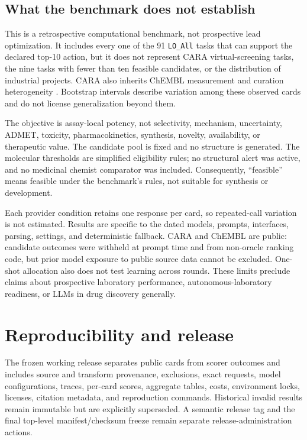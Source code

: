\documentclass[10pt,a4paper]{article}
\begin{document}
\subsection{What the benchmark does not establish}

This is a retrospective computational benchmark, not prospective lead
optimization. It includes every one of the 91 \texttt{LO\_All} tasks that can
support the declared top-10 action, but it does not represent CARA
virtual-screening tasks, the nine tasks with fewer than ten feasible candidates,
or the distribution of industrial projects. CARA also inherits ChEMBL
measurement and curation heterogeneity \cite{zdrazil2024chembl}. Bootstrap
intervals describe variation among these observed cards and do not license
generalization beyond them.

The objective is assay-local potency, not selectivity, mechanism, uncertainty,
ADMET, toxicity, pharmacokinetics, synthesis, novelty, availability, or
therapeutic value. The candidate pool is fixed and no structure is generated.
The molecular thresholds are simplified eligibility rules; no structural alert
was active, and no medicinal chemist comparator was included. Consequently,
``feasible'' means feasible under the benchmark's rules, not suitable for
synthesis or development.

Each provider condition retains one response per card, so repeated-call
variation is not estimated. Results are specific to the dated models, prompts,
interfaces, parsing, settings, and deterministic fallback. CARA and ChEMBL are
public: candidate outcomes were withheld at prompt time and from non-oracle
ranking code, but prior model exposure to public source data cannot be excluded.
One-shot allocation also does not test learning across rounds. These limits
preclude claims about prospective laboratory performance, autonomous-laboratory
readiness, or LLMs in drug discovery generally.

\section{Reproducibility and release}

The frozen working release separates public cards from scorer outcomes and
includes source and transform provenance, exclusions, exact requests, model
configurations, traces, per-card scores, aggregate tables, costs, environment
locks, licenses, citation metadata, and reproduction commands. Historical
invalid results remain immutable but are explicitly superseded. A semantic
release tag and the final top-level manifest/checksum freeze remain separate
release-administration actions.
\end{document}
